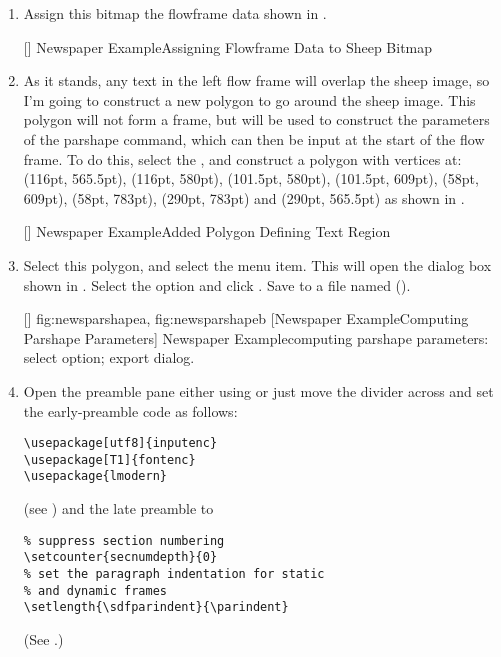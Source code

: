 \begin{enumerate}
[]
{}
{Newspaper Example\dash Added Sheep Bitmap}

\item Assign this \gls{bitmap} the \gls{flowframe} data shown in
.

[]
{}
{Newspaper Example\dash Assigning Flowframe Data to Sheep
Bitmap}

\item As it stands, any text in the left flow frame will overlap
the sheep image, so I'm going to construct a new polygon to go
around the sheep image. This polygon will not form a frame, but
will be used to construct the parameters of the \gls{parshape}
command, which can then be input at the start of the flow frame.
To do this, select the ,
and construct a polygon
with vertices at: (116pt, 565.5pt), (116pt, 580pt), (101.5pt, 580pt),
(101.5pt, 609pt), (58pt, 609pt), (58pt, 783pt), (290pt, 783pt)
and (290pt, 565.5pt) as shown in .

[]
{}
{Newspaper Example\dash Added Polygon Defining Text Region}

\item Select this polygon, and select the  menu
item. This will open the  dialog box shown in
.  Select the
 option and click .  Save to a
file named 
().

[]
{
 {fig:newsparshapea}{}{},
 {fig:newsparshapeb}{}{}
}
[Newspaper Example\dash Computing Parshape Parameters]
{Newspaper Example\dash computing \gls{parshape}
parameters:
 select  option;
 export dialog.}

\item Open the preamble pane either using 
 or just move the divider across and set the
\gls{early-preamble} code as follows:
\begin{verbatim}
\usepackage[utf8]{inputenc}
\usepackage[T1]{fontenc}
\usepackage{lmodern}
\end{verbatim}
(see ) and the late preamble to
\begin{verbatim}
% suppress section numbering
\setcounter{secnumdepth}{0}
% set the paragraph indentation for static
% and dynamic frames
\setlength{\sdfparindent}{\parindent}
\end{verbatim}
(See .)


\end{enumerate}

